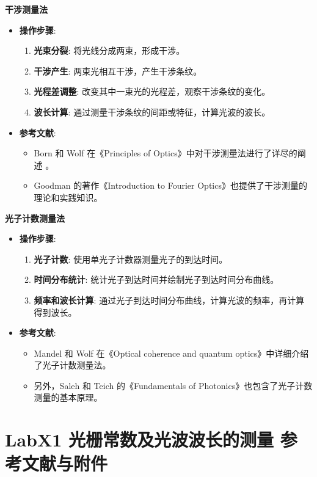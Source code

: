 \documentclass[dvipsnames, svgnames,a4paper,11pt]{article}
\begin{document}
		\textbf{\large 干涉测量法}
		\begin{itemize}
			\item \textbf{操作步骤}:
			\begin{enumerate}
				\item \textbf{光束分裂}: 将光线分成两束，形成干涉。
				\item \textbf{干涉产生}: 两束光相互干涉，产生干涉条纹。
				\item \textbf{光程差调整}: 改变其中一束光的光程差，观察干涉条纹的变化。
				\item \textbf{波长计算}: 通过测量干涉条纹的间距或特征，计算光波的波长。
			\end{enumerate}
			\item \textbf{参考文献}:
			\begin{itemize}
				\item Born 和 Wolf 在《Principles of Optics》中对干涉测量法进行了详尽的阐述 \cite{born1999principles}。
				\item Goodman 的著作《Introduction to Fourier Optics》也提供了干涉测量的理论和实践知识。
			\end{itemize}
		\end{itemize}
		
		\textbf{\large 光子计数测量法}		
		\begin{itemize}
			\item \textbf{操作步骤}:
			\begin{enumerate}
				\item \textbf{光子计数}: 使用单光子计数器测量光子的到达时间。
				\item \textbf{时间分布统计}: 统计光子到达时间并绘制光子到达时间分布曲线。
				\item \textbf{频率和波长计算}: 通过光子到达时间分布曲线，计算光波的频率，再计算得到波长。
			\end{enumerate}
			\item \textbf{参考文献}:
			\begin{itemize}
				\item Mandel 和 Wolf 在《Optical coherence and quantum optics》中详细介绍了光子计数测量法。
				\item 另外，Saleh 和 Teich 的《Fundamentals of Photonics》也包含了光子计数测量的基本原理。
			\end{itemize}
		\end{itemize}
	
	
			
	\clearpage
	\section{LabX1 光栅常数及光波波长的测量 \quad\heiti 参考文献与附件}
\end{document}
